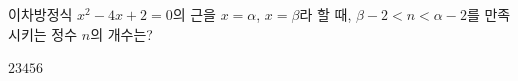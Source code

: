 이차방정식 $x^2-4x+2=0$의 근을 $x=\alpha$, $x=\beta$라 할 때, $\beta-2<n<\alpha-2$를 만족시키는 정수 $n$의 개수는? \cond{$\alpha>\beta$}
\begin{choices32}{$2$}{$3$}{$4$}{$5$}{$6$}\end{choices32}
